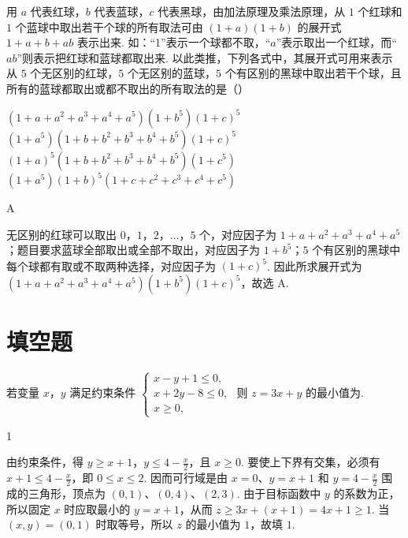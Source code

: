 \begin{problem}
用 \(a\) 代表红球，\(b\) 代表蓝球，\(c\) 代表黑球，由加法原理及乘法原理，从 \(1\) 个红球和 \(1\) 个蓝球中取出若干个球的所有取法可由 \((1 + a)(1 + b)\) 的展开式 \(1 + a + b + ab\) 表示出来. 如：“1”表示一个球都不取，“\(a\)”表示取出一个红球，而“\(ab\)”则表示把红球和蓝球都取出来. 以此类推，下列各式中，其展开式可用来表示从 \(5\) 个无区别的红球，\(5\) 个无区别的蓝球，\(5\) 个有区别的黑球中取出若干个球，且所有的蓝球都取出或都不取出的所有取法的是（\quad）

\choices
    {\((1 + a + a^2 + a^3 + a^4 + a^5)(1 + b^5)(1 + c)^5\)}
    {\((1 + a^5)(1 + b + b^2 + b^3 + b^4 + b^5)(1 + c)^5\)}
    {\((1 + a)^5(1 + b + b^2 + b^3 + b^4 + b^5)(1 + c^5)\)}
    {\((1 + a^5)(1 + b)^5(1 + c + c^2 + c^3 + c^4 + c^5)\)}
\end{problem}

\begin{answer}
A
\end{answer}

\begin{solution}
无区别的红球可以取出 \(0\)，\(1\)，\(2\)，\(\ldots\)，\(5\) 个，对应因子为 \(1+a+a^2+a^3+a^4+a^5\)；题目要求蓝球全部取出或全部不取出，对应因子为 \(1+b^5\)；\(5\) 个有区别的黑球中每个球都有取或不取两种选择，对应因子为 \((1+c)^5\). 因此所求展开式为
\((1+a+a^2+a^3+a^4+a^5)(1+b^5)(1+c)^5\)，故选 A.
\end{solution}

\section{填空题}

\begin{problem}
若变量 \(x\)，\(y\) 满足约束条件 \(\begin{cases}
x - y + 1 \leqslant 0,\\
x + 2y - 8 \leqslant 0,\\
x \geqslant 0,
\end{cases}\) 则 \(z = 3x + y\) 的最小值为\fillinblank{}.
\end{problem}

\begin{answer}
1
\end{answer}

\begin{solution}
由约束条件，得 \(y\geqslant x+1\)，\(y\leqslant4-\frac{x}{2}\)，且 \(x\geqslant0\). 要使上下界有交集，必须有 \(x+1\leqslant4-\frac{x}{2}\)，即 \(0\leqslant x\leqslant2\). 因而可行域是由 \(x=0\)、\(y=x+1\) 和 \(y=4-\frac{x}{2}\) 围成的三角形，顶点为 \((0,1)\)、\((0,4)\)、\((2,3)\). 由于目标函数中 \(y\) 的系数为正，所以固定 \(x\) 时应取最小的 \(y=x+1\)，从而 \(z\geqslant3x+(x+1)=4x+1\geqslant1\). 当 \((x,y)=(0,1)\) 时取等号，所以 \(z\) 的最小值为 \(1\)，故填 \(1\).
\end{solution}

